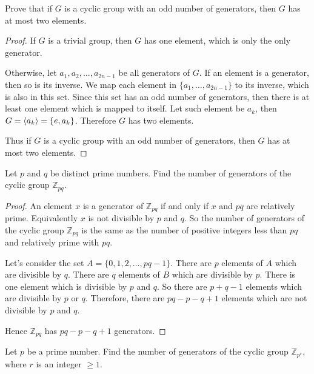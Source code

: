 \newpage
\begin{exercise}
    Prove that if $G$ is a cyclic group with an odd number of generators, then $G$ has at most two elements.
\end{exercise}

\begin{proof}
    If $G$ is a trivial group, then $G$ has one element, which is only the only generator.

    Otherwise, let $a_{1}, a_{2}, \ldots, a_{2n-1}$ be all generators of $G$. If an element is a generator, then so is its inverse. We map each element in $\{ a_{1}, \ldots, a_{2n-1} \}$ to its inverse, which is also in this set. Since this set has an odd number of generators, then there is at least one element which is mapped to itself. Let such element be $a_{k}$, then $G = \left\langle{a_{k}}\right\rangle = \{ e, a_{k} \}$. Therefore $G$ has two elements.

    Thus if $G$ is a cyclic group with an odd number of generators, then $G$ has at most two elements.
\end{proof}

\newpage
\begin{exercise}
    Let $p$ and $q$ be distinct prime numbers. Find the number of generators of the cyclic group $\mathbb{Z}_{pq}$.
\end{exercise}

\begin{proof}
    An element $x$ is a generator of $\mathbb{Z}_{pq}$ if and only if $x$ and $pq$ are relatively prime. Equivalently $x$ is not divisible by $p$ and $q$. So the number of generators of the cyclic group $\mathbb{Z}_{pq}$ is the same as the number of positive integers less than $pq$ and relatively prime with $pq$.

    Let's consider the set $A = \{ 0, 1, 2, \ldots, pq - 1 \}$. There are $p$ elements of $A$ which are divisible by $q$. There are $q$ elements of $B$ which are divisible by $p$. There is one element which is divisible by $p$ and $q$. So there are $p + q - 1$ elements which are divisible by $p$ or $q$. Therefore, there are $pq - p - q + 1$ elements which are not divisible by $p$ and $q$.

    Hence $\mathbb{Z}_{pq}$ has $pq - p - q + 1$ generators.
\end{proof}

\newpage
\begin{exercise}
    Let $p$ be a prime number. Find the number of generators of the cyclic group $\mathbb{Z}_{{p}^{r}}$, where $r$ is an integer $\geq 1$.
\end{exercise}

